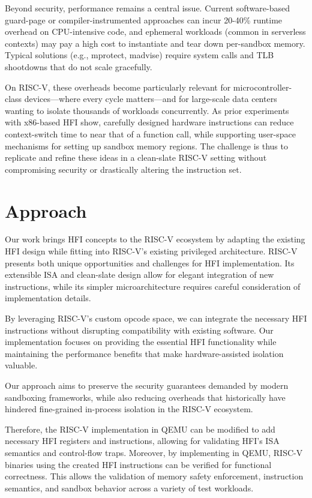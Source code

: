 \documentclass[conference,compsoc]{IEEEtran}
\begin{document}
Beyond security, performance remains a central issue. Current software-based guard-page or compiler-instrumented approaches can incur 20-40\% runtime overhead on CPU-intensive code, and ephemeral workloads (common in serverless contexts) may pay a high cost to instantiate and tear down per-sandbox memory. Typical solutions (e.g., mprotect, madvise) require system calls and TLB shootdowns that do not scale gracefully.

On RISC-V, these overheads become particularly relevant for microcontroller-class devices—where every cycle matters—and for large-scale data centers wanting to isolate thousands of workloads concurrently. As prior experiments with x86-based HFI show, carefully designed hardware instructions can reduce context-switch time to near that of a function call, while supporting user-space mechanisms for setting up sandbox memory regions. The challenge is thus to replicate and refine these ideas in a clean-slate RISC-V setting without compromising security or drastically altering the instruction set.

\section{Approach}
Our work brings HFI concepts to the RISC-V ecosystem by adapting the existing HFI design while fitting into RISC-V's existing privileged architecture. RISC-V presents both unique opportunities and challenges for HFI implementation. Its extensible ISA and clean-slate design allow for elegant integration of new instructions, while its simpler microarchitecture requires careful consideration of implementation details.

By leveraging RISC-V's custom opcode space, we can integrate the necessary HFI instructions without disrupting compatibility with existing software. Our implementation focuses on providing the essential HFI functionality while maintaining the performance benefits that make hardware-assisted isolation valuable.

Our approach aims to preserve the security guarantees demanded by modern sandboxing frameworks, while also reducing overheads that historically have hindered fine-grained in-process isolation in the RISC-V ecosystem.

Therefore, the RISC-V implementation in QEMU can be modified to add necessary HFI registers and instructions, allowing for validating HFI's ISA semantics and control-flow traps. 
Moreover, by implementing in QEMU, RISC-V binaries using the created HFI instructions can be verified for functional correctness.
This allows the validation of memory safety enforcement, instruction semantics, and sandbox behavior across a variety of test workloads.
\end{document}
